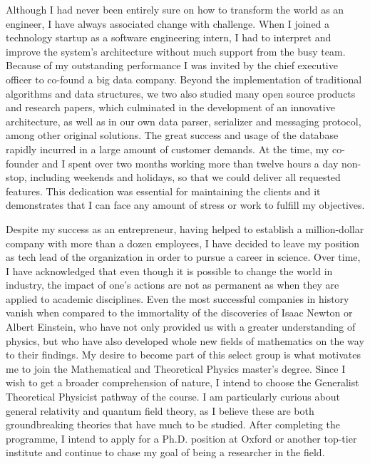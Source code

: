 \documentclass[10pt]{article}
\newcommand*{\NEWLINE}{\vspace{0.75em}}
\begin{document}
Although I had never been entirely sure on how to transform the world as an engineer, I have always associated change with challenge. When I joined a technology startup as a software engineering intern, I had to interpret and improve the system's architecture without much support from the busy team. Because of my outstanding performance I was invited by the chief executive officer to co-found a big data company. Beyond the implementation of traditional algorithms and data structures, we two also studied many open source products and research papers, which culminated in the development of an innovative architecture, as well as in our own data parser, serializer and messaging protocol, among other original solutions. The great success and usage of the database rapidly incurred in a large amount of customer demands. At the time, my co-founder and I spent over two months working more than twelve hours a day non-stop, including weekends and holidays, so that we could deliver all requested features. This dedication was essential for maintaining the clients and it demonstrates that I can face any amount of stress or work to fulfill my objectives. \NEWLINE{}

Despite my success as an entrepreneur, having helped to establish a million-dollar company with more than a dozen employees, I have decided to leave my position as tech lead of the organization in order to pursue a career in science. Over time, I have acknowledged that even though it is possible to change the world in industry, the impact of one's actions are not as permanent as when they are applied to academic disciplines. Even the most successful companies in history vanish when compared to the immortality of the discoveries of Isaac Newton or Albert Einstein, who have not only provided us with a greater understanding of physics, but who have also developed whole new fields of mathematics on the way to their findings. My desire to become part of this select group is what motivates me to join the Mathematical and Theoretical Physics master's degree. Since I wish to get a broader comprehension of nature, I intend to choose the Generalist Theoretical Physicist pathway of the course. I am particularly curious about general relativity and quantum field theory, as I believe these are both groundbreaking theories that have much to be studied. After completing the programme, I intend to apply for a Ph.D. position at Oxford or another top-tier institute and continue to chase my goal of being a researcher in the field. 
\end{document}
